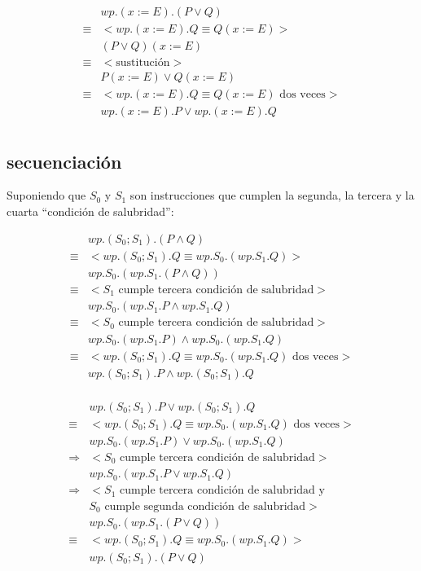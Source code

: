 \documentclass{article}
\begin{document}
\begin{align*}
 & wp.(x := E).(P \vee Q) \\
 \equiv & <wp.(x := E).Q \equiv Q(x := E)> \\
 & (P \vee Q)(x := E) \\
 \equiv & <\text{sustitución}> \\
 & P(x := E) \vee Q(x := E) \\
 \equiv & <wp.(x := E).Q \equiv Q(x := E) \text{ dos veces}> \\
 & wp.(x := E).P \vee wp.(x := E).Q \\
\end{align*}

\subsection{secuenciación}

Suponiendo que $S_0$ y $S_1$ son instrucciones que
cumplen la segunda, la tercera y la cuarta ``condición de salubridad'':

\begin{align*}
 & wp.(S_0 ; S_1).(P \wedge Q) \\
 \equiv & <wp.(S_0 ; S_1).Q \equiv wp.S_0.(wp.S_1.Q)> \\
 & wp.S_0.(wp.S_1.(P \wedge Q)) \\
 \equiv & <S_1 \text{ cumple tercera condición de salubridad}> \\
 & wp.S_0.(wp.S_1.P \wedge wp.S_1.Q) \\
 \equiv & <S_0 \text{ cumple tercera condición de salubridad}> \\
 & wp.S_0.(wp.S_1.P) \wedge wp.S_0.(wp.S_1.Q) \\
 \equiv & <wp.(S_0 ; S_1).Q \equiv wp.S_0.(wp.S_1.Q) \text{ dos veces}> \\
 & wp.(S_0 ; S_1).P \wedge wp.(S_0 ; S_1).Q \\
\end{align*}

\begin{align*}
 & wp.(S_0 ; S_1).P \vee wp.(S_0 ; S_1).Q \\
 \equiv & <wp.(S_0 ; S_1).Q \equiv wp.S_0.(wp.S_1.Q) \text{ dos veces}> \\
 & wp.S_0.(wp.S_1.P) \vee wp.S_0.(wp.S_1.Q) \\
 \Rightarrow & <S_0 \text{ cumple tercera condición de salubridad}> \\
 & wp.S_0.(wp.S_1.P \vee wp.S_1.Q) \\
 \Rightarrow & <S_1 \text{ cumple tercera condición de salubridad y} \\
             & S_0 \text{ cumple segunda condición de salubridad}> \\
 & wp.S_0.(wp.S_1.(P \vee Q)) \\
 \equiv & <wp.(S_0 ; S_1).Q \equiv wp.S_0.(wp.S_1.Q)> \\
 & wp.(S_0 ; S_1).(P \vee Q) \\
\end{align*}

\section{}
\end{document}
